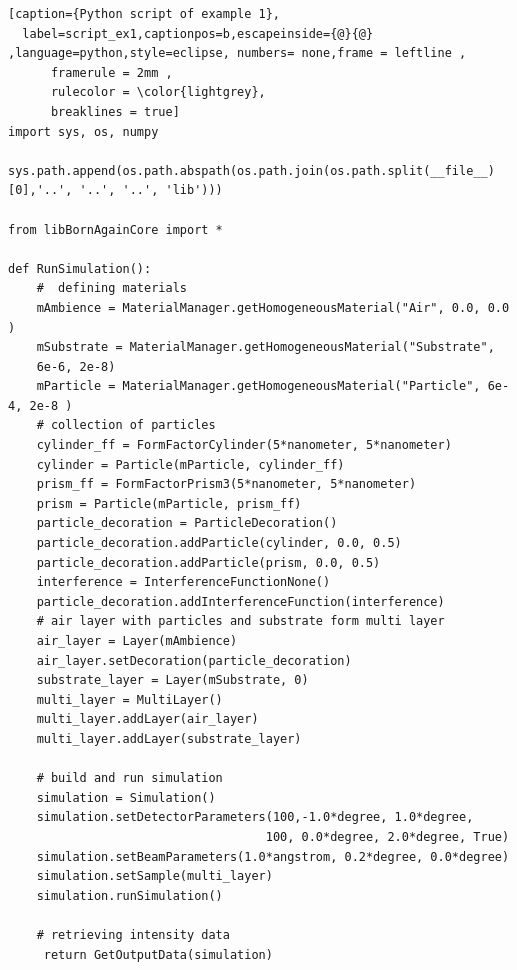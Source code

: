 \newpage
\begin{lstlisting}[caption={Python script of example 1},
  label=script_ex1,captionpos=b,escapeinside={@}{@} ,language=python,style=eclipse, numbers= none,frame = leftline ,
      framerule = 2mm ,
      rulecolor = \color{lightgrey},
      breaklines = true]
import sys, os, numpy 

sys.path.append(os.path.abspath(os.path.join(os.path.split(__file__)[0],'..', '..', '..', 'lib')))

from libBornAgainCore import * 

def RunSimulation():
    #  defining materials 
    mAmbience = MaterialManager.getHomogeneousMaterial("Air", 0.0, 0.0 ) 
    mSubstrate = MaterialManager.getHomogeneousMaterial("Substrate",
    6e-6, 2e-8) 
    mParticle = MaterialManager.getHomogeneousMaterial("Particle", 6e-4, 2e-8 )
    # collection of particles 
    cylinder_ff = FormFactorCylinder(5*nanometer, 5*nanometer) 
    cylinder = Particle(mParticle, cylinder_ff) 
    prism_ff = FormFactorPrism3(5*nanometer, 5*nanometer) 
    prism = Particle(mParticle, prism_ff) 
    particle_decoration = ParticleDecoration()  
    particle_decoration.addParticle(cylinder, 0.0, 0.5)  
    particle_decoration.addParticle(prism, 0.0, 0.5)  
    interference = InterferenceFunctionNone()  
    particle_decoration.addInterferenceFunction(interference)  
    # air layer with particles and substrate form multi layer 
    air_layer = Layer(mAmbience)  
    air_layer.setDecoration(particle_decoration)
    substrate_layer = Layer(mSubstrate, 0) 
    multi_layer = MultiLayer()  
    multi_layer.addLayer(air_layer) 
    multi_layer.addLayer(substrate_layer) 

    # build and run simulation  
    simulation = Simulation()  
    simulation.setDetectorParameters(100,-1.0*degree, 1.0*degree, 
                                    100, 0.0*degree, 2.0*degree, True) 
    simulation.setBeamParameters(1.0*angstrom, 0.2*degree, 0.0*degree) 
    simulation.setSample(multi_layer) 
    simulation.runSimulation()  

    # retrieving intensity data
     return GetOutputData(simulation)
\end{lstlisting}

